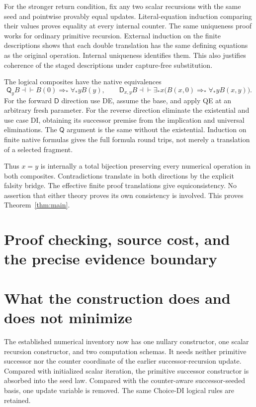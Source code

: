 \documentclass[11pt,letterpaper]{article}
\theoremstyle{definition}\newtheorem{definition}[theorem]{Definition}
\theoremstyle{remark}\newtheorem{remark}[theorem]{Remark}
\newcommand{\D}{\mathsf D}
\newcommand{\Q}{\mathsf Q}
\begin{document}
For the stronger return condition, fix any two scalar recursions with
the same seed and pointwise provably equal updates. Literal-equation
induction comparing their values proves equality at every internal
counter. The same uniqueness proof works for ordinary primitive
recursion. External induction on the finite descriptions shows that
each double translation has the same defining equations as the original
operation. Internal uniqueness identifies them. This also justifies
coherence of the staged descriptions under capture-free substitution.

The logical composites have the native equivalences
\[
 \Q_yB\dashv\vdash B(0)\Rightarrow_*\forall_*yB(y),
 \qquad
 \D_{x,y}B\dashv\vdash
 \exists_*x\bigl(B(x,0)\Rightarrow_*\forall_*yB(x,y)\bigr).
\]
For the forward $\D$ direction use DE, assume the base, and apply QE at
an arbitrary fresh parameter. For the reverse direction eliminate the
existential and use case DI, obtaining its successor premise from the
implication and universal eliminations. The $\Q$ argument is the same
without the existential. Induction on finite native formulas gives the
full formula round trips, not merely a translation of a selected fragment.

Thus $x=y$ is internally a total bijection preserving every numerical
operation in both composites. Contradictions translate in both directions
by the explicit falsity bridge. The effective finite proof translations
give equiconsistency. No assertion that either theory proves its own
consistency is involved. This proves Theorem~\ref{thm:main}.

\section{Proof checking, source cost, and the precise evidence boundary}
\label{sec:implementation}


\section{What the construction does and does not minimize}

The established numerical inventory now has one nullary constructor,
one scalar recursion constructor, and two computation schemas. It needs
neither primitive successor nor the counter coordinate of the earlier
successor-recursion update. Compared with initialized scalar iteration,
the primitive successor constructor is absorbed into the seed law.
Compared with the counter-aware successor-seeded basis, one update
variable is removed. The same Choice-DI logical rules are retained.
\end{document}
